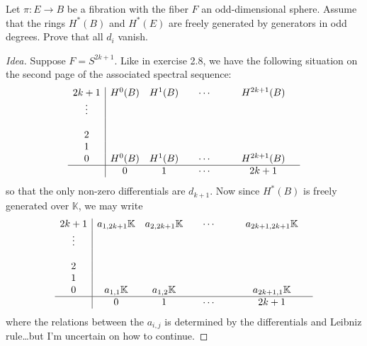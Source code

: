 \begin{manualexercise}{2.11}
	Let $\pi:E\to B$ be a fibration with the fiber $F$ an odd-dimensional sphere. Assume that the rings $H^{*}(B)$ and  $H^{*}(E)$ are freely generated by generators in odd degrees. Prove that all $d_i$ vanish.
\end{manualexercise}

\begin{proof}[Idea]\leavevmode
	Suppose $F=S^{2k+1}$. Like in exercise 2.8, we have the following situation on the second page of the associated spectral sequence:
	\begin{align*}
\begin{array}{c|cccccccc}
	2k+1&H^0(B)&H^{1}(B)&&\cdots&&&H^{2k+1}(B)&\\
	\vdots &&&&&&&&\\
	&&&&&&&&\\
	2&&&&&&&&\\
	1&&&&&&&&\\
	0&H^0(B)&H^{1}(B)&&\cdots&&&H^{2k+1}(B)&\\
	\hline
	 &0&1&&\cdots &&&2k+1&
\end{array}
\end{align*}
so that the only non-zero differentials are $d_{k+1}$. Now since $H^*(B)$ is freely generated over $\mathbb{K}$, we may write
	\begin{align*}
\begin{array}{c|cccccccc}
	2k+1&a_{1,2k+1}\mathbb{K}&a_{2,2k+1}\mathbb{K}&&\cdots&&&a_{2k+1,2k+1}\mathbb{K}&\\
	\vdots &&&&&&&&\\
	&&&&&&&&\\
	2&&&&&&&&\\
	1&&&&&&&&\\
	0&a_{1,1}\mathbb{K}&a_{1,2}\mathbb{K}&&&&&a_{2k+1,1}\mathbb{K}\\
	\hline
	 &0&1&&\cdots &&&2k+1&
\end{array}
\end{align*}
where the relations between the $a_{i,j}$ is determined by the differentials and Leibniz rule…but I'm uncertain on how to continue.
\end{proof}
\iffalse
\begin{manualexercise}{last}
	Generators here (horizontal), generators there (vertical, 1,3,5), "Extend generators by Leibniz rule, and then they just kill everyting"
\end{manualexercise}
\fi

